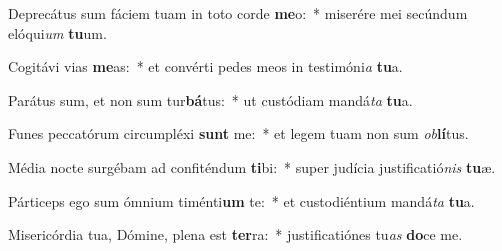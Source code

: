 \item Deprecátus sum fáciem tuam in toto corde \textbf{me}o:~* miserére mei secúndum elóqui\textit{um} \textbf{tu}um.
\item Cogitávi vias \textbf{me}as:~* et convérti pedes meos in testimóni\textit{a} \textbf{tu}a.
\item Parátus sum, et non sum tur\textbf{bá}tus:~* ut custódiam mandá\textit{ta} \textbf{tu}a.
\item Funes peccatórum circumpléxi \textbf{sunt} me:~* et legem tuam non sum \textit{ob}\textbf{lí}tus.
\item Média nocte surgébam ad confiténdum \textbf{ti}bi:~* super judícia justificatió\textit{nis} \textbf{tu}æ.
\item Párticeps ego sum ómnium timénti\textbf{um} te:~* et custodiéntium mandá\textit{ta} \textbf{tu}a.
\item Misericórdia tua, Dómine, plena est \textbf{ter}ra:~* justificatiónes tu\textit{as} \textbf{do}ce me.
